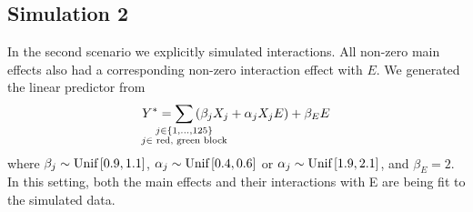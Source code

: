 \subsection*{Simulation 2}
In the second scenario we explicitly simulated interactions. All non-zero main effects also had a corresponding non-zero interaction effect with $E$. We generated the linear predictor from
\begin{equation}
Y^* = \sum_{\mathclap{\substack{j\in \left\lbrace 1, \ldots, 125 \right\rbrace\\ j \in \tm{ red, green block}}}} \left(\beta_j X_j + \alpha_{j} X_j E\right) + \beta_E E 
\end{equation}
where $\beta_j \sim \textrm{{Unif}}\left[ 0.9,1.1\right]$, $\alpha_{j} \sim \textrm{{Unif}}\left[ 0.4,0.6\right]$ or $\alpha_{j} \sim \textrm{{Unif}}\left[ 1.9,2.1\right]$, and \mbox{$\beta_E = 2$}. In this setting, both the main effects and their interactions with E are being fit to the simulated data. 

